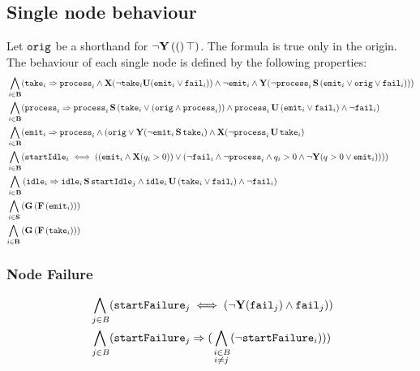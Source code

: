 
\subsection*{Single node behaviour}
Let $\mathtt{orig}$ be a shorthand for $\neg\mathbf{Y}\left((\right)\top)$.
The formula is true only in the origin.
The behaviour of each single node is defined by the following properties:
\begin{align*}
 \bigwedge_{
i \in \mathbf{B} } 
&(\ta{i} \Rightarrow 
\p{i} \wedge \mathbf{X}(\lnot \ta{i} \U (\e{i} \lor \f{i})) \land \lnot \e{i}
\land \mathbf{Y}(\lnot \p{i} \, \Snc \, (\e{i}\lor \ori \lor \f{i}))
) \\
%
 \bigwedge_{
i \in \mathbf{B} } 
&(\p{i} \Rightarrow 
\p{i} \, \Snc \, ( \ta{i} \lor (\ori \land \p{i})) \land \p{i} \, \U \, (\e{i} \lor \f{i}) \land \lnot \f{i}) \\
%
 \bigwedge_{
i \in \mathbf{B} } 
&(\e{i} \Rightarrow \p{i} 
\wedge (\ori \lor \mathbf{Y}(\lnot \e{i} \, \Snc \, \ta{i})
\land \mathbf{X}(\lnot \p{i} \, \U \, \ta{i}) \\
%
\bigwedge_{
	\begin{subarray}{c}
	\,i \in \mathbf{B}
	\end{subarray}
}
&(\startid{i} \iff ( (\e{i} \land \mathbf{X}(q_i>0)) \lor (\lnot \f{i} \land \lnot \p{i} \land q_i>0 \land \lnot \mathbf{Y}(q>0 \lor \e{i}) ) ))\\
%
%
\bigwedge_{
	i \in \mathbf{B} } 
&\left( 
\id{i} \Rightarrow 
\id{i} \, \Snc \, \startid{j} \land 
\id{i} \, \U \, (\ta{i} \lor \f{i}) \land \lnot \f{i}
\right)  \\
%
%
\bigwedge_{
i \in \mathbf{S}} \,
&(\G{\F{\e{i}}}) \\
%
%
 \bigwedge_{
\begin{subarray}{c}
i \in \mathbf{B}
\end{subarray}} \,
&(\G{\F{\ta{i}}}) 
%
\end{align*}  


\subsubsection*{Node Failure}


\begin{align*}
%
 &\bigwedge_{
\begin{subarray}{c}
\,j \in B
\end{subarray}
}
(\startf{j} \iff (\lnot \mathbf{Y}(\f{j}) \land \f{j}))\\
%
% 
%
&\bigwedge_{
\begin{subarray}{c}
\,j \in B
\end{subarray}
}
(\startf{j} \Rightarrow 
(
\bigwedge_{
	\begin{subarray}{c}
	\,i \in B \\
	i \neq j 
	\end{subarray}
}
(\lnot \startf{i})
))
%
\end{align*}


